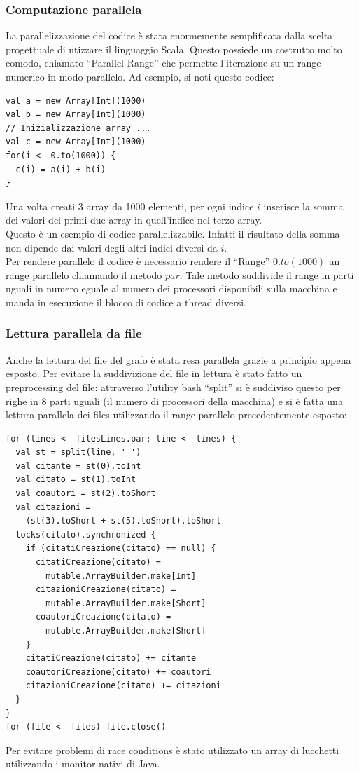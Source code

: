 \documentclass[a4paper, 12pt]{article}
\begin{document}
\subsubsection{Computazione parallela}
La parallelizzazione del codice è stata enormemente semplificata dalla scelta progettuale di utizzare il linguaggio Scala. Questo possiede un costrutto molto comodo, chiamato ``Parallel Range'' che permette l'iterazione su un range numerico in modo parallelo.
Ad esempio, si noti questo codice:
\begin{lstlisting}[keepspaces=true]
val a = new Array[Int](1000)
val b = new Array[Int](1000)
// Inizializzazione array ...
val c = new Array[Int](1000)
for(i <- 0.to(1000)) {
  c(i) = a(i) + b(i)
}
\end{lstlisting}
Una volta creati 3 array da 1000 elementi, per ogni indice $i$ inserisce la somma dei valori dei primi due array in quell'indice nel terzo array. \\
Questo è un esempio di codice parallelizzabile. Infatti il risultato della somma non dipende dai valori degli altri indici diversi da $i$. \\
Per rendere parallelo il codice è necessario rendere il ``Range'' $0.to(1000)$ un range parallelo chiamando il metodo $par$. Tale metodo suddivide il range in parti uguali in numero eguale al numero dei processori disponibili sulla macchina e manda in esecuzione il blocco di codice a thread diversi.
\subsubsection{Lettura parallela da file}
Anche la lettura del file del grafo è stata resa parallela grazie a principio appena esposto. Per evitare la suddivizione del file in lettura è stato fatto un preprocessing del file: attraverso l'utility bash ``split'' si è suddiviso questo per righe in 8 parti uguali (il numero di processori della macchina) e si è fatta una lettura parallela dei files utilizzando il range parallelo precedentemente esposto:
\begin{lstlisting}[keepspaces=true]
for (lines <- filesLines.par; line <- lines) {
  val st = split(line, ' ')
  val citante = st(0).toInt
  val citato = st(1).toInt
  val coautori = st(2).toShort
  val citazioni =
    (st(3).toShort + st(5).toShort).toShort
  locks(citato).synchronized {
    if (citatiCreazione(citato) == null) {
      citatiCreazione(citato) =
        mutable.ArrayBuilder.make[Int]
      citazioniCreazione(citato) = 
        mutable.ArrayBuilder.make[Short]
      coautoriCreazione(citato) =
        mutable.ArrayBuilder.make[Short]
    }
    citatiCreazione(citato) += citante
    coautoriCreazione(citato) += coautori
    citazioniCreazione(citato) += citazioni
  }
}
for (file <- files) file.close()
\end{lstlisting}
Per evitare problemi di race conditions è stato utilizzato un array di lucchetti utilizzando i monitor nativi di Java.
\end{document}

